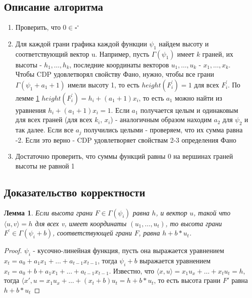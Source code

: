 \documentclass[16pt]{article}
\newtheorem{lemma}[theorem]{Лемма}
\theoremstyle{definition}
\begin{document}
\subsection{Описание алгоритма}
\begin{enumerate}
	\item Проверить, что $0 \in \square^{\circ}$
	\item Для каждой грани графика каждой функции $\psi_1$ найдем высоту и соответствующий вектор u. Например, пусть $\Gamma(\psi_1)$ имеет $k$ граней, их высоты - $h_1, \dots, h_k$, последние координаты векторов $u_1, \dots, u_k$ - $x_1, \dots, x_k$. Чтобы CDP удовлетворял свойству Фано, нужно, чтобы все грани $\Gamma(\psi_1 + a_1 + 1)$ имели высоту 1, то есть $height(F_i^{'}) = 1$  для всех $F_i^{'}$. По лемме \ref{facet_height} $height(F_i^{'}) = h_i + (a_1 + 1)x_i$, то есть $a_1$ можно найти из уравнения $h_i + (a_1 + 1)x_i = 1$. Если $a_1$ получается целым и одинаковым для всех граней (для всех $k_i$, $x_i$) - аналогичным образом находим $a_2$ для $\psi_2$ и так далее. Если все $a_j$ получились целыми - проверяем, что их сумма равна -2. Если это верно - CDP удовлетворяет свойствам 2-3 определения Фано
	\item Достаточно проверить, что суммы функций равны 0 на вершинах граней высоты не равной 1
\end{enumerate}


\subsection{Доказательство корректности}
\begin{lemma}
\label{facet_height}
	Если высота грани $F \in \Gamma(\psi_i)$ равна $h$, и вектор $u$, такой что $\langle u, v\rangle = h$ для всех v, имеет координаты $(u_1, \dots, u_t)$, то высота грани $F^{'} \in \Gamma(\psi_i + b)$, соответствующей грани $F$, равна $h + b * u_t$. 
\end{lemma}
\begin{proof}
	
	$\psi_i$ - кусочно-линейная функция, пусть она выражается уравнением $x_t = a_0 + a_1 x_1 + \dots + a_{t-1}x_{t-1}$, тогда $\psi_i + b$ выражается уравнением  $x_t = a_0 + b + a_1x_1 + \dots + a_{t-1}x_{t-1}$. Известно, что $\langle x, u \rangle = x_1 u_x + \dots + x_t u_t = h$, тогда $\langle x', u = x_1 u_x + \dots + (x_t + b) u_t = h + b*u_t$, то есть высота грани $F'$ равна $h + b * u_t$
\end{proof}
	
\end{document}
